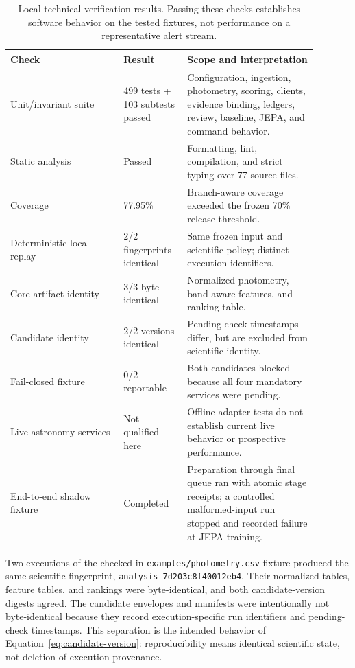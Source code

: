 \documentclass[11pt]{article}
\begin{document}
\begin{table}[ht]
\centering
\caption{Local technical-verification results. Passing these checks establishes software behavior on the tested fixtures, not performance on a representative alert stream.}
\label{tab:software-verification}
\begin{tabular}{p{0.33\linewidth}p{0.18\linewidth}p{0.38\linewidth}}
\toprule
Check & Result & Scope and interpretation \\
\midrule
Unit/invariant suite & 499 tests + 103 subtests passed & Configuration, ingestion, photometry, scoring, clients, evidence binding, ledgers, review, baseline, JEPA, and command behavior. \\
Static analysis & Passed & Formatting, lint, compilation, and strict typing over 77 source files. \\
Coverage & 77.95\% & Branch-aware coverage exceeded the frozen 70\% release threshold. \\
Deterministic local replay & 2/2 fingerprints identical & Same frozen input and scientific policy; distinct execution identifiers. \\
Core artifact identity & 3/3 byte-identical & Normalized photometry, band-aware features, and ranking table. \\
Candidate identity & 2/2 versions identical & Pending-check timestamps differ, but are excluded from scientific identity. \\
Fail-closed fixture & 0/2 reportable & Both candidates blocked because all four mandatory services were pending. \\
Live astronomy services & Not qualified here & Offline adapter tests do not establish current live behavior or prospective performance. \\
End-to-end shadow fixture & Completed & Preparation through final queue ran with atomic stage receipts; a controlled malformed-input run stopped and recorded failure at JEPA training. \\
\bottomrule
\end{tabular}
\end{table}

Two executions of the checked-in \texttt{examples/photometry.csv} fixture produced the same scientific fingerprint, \texttt{analysis-7d203c8f40012eb4}. Their normalized tables, feature tables, and rankings were byte-identical, and both candidate-version digests agreed. The candidate envelopes and manifests were intentionally not byte-identical because they record execution-specific run identifiers and pending-check timestamps. This separation is the intended behavior of Equation~\ref{eq:candidate-version}: reproducibility means identical scientific state, not deletion of execution provenance.
\end{document}
